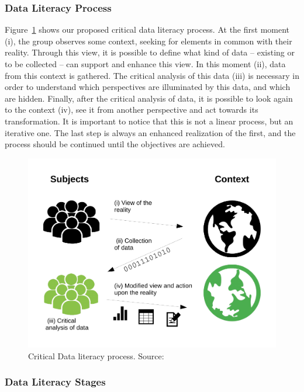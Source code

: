 \subsubsection{Data Literacy Process}

Figure~\ref{fig:critical_dl} shows our proposed critical data literacy process. At the first moment (i), the group observes some context, seeking for elements in common with their reality. Through this view, it is possible to define what kind of data – existing or to be collected – can support and enhance this view. In this moment (ii), data from this context is gathered. The critical analysis of this data (iii) is necessary in order to understand which perspectives are illuminated by this data, and which are hidden. Finally, after the critical analysis of data, it is possible to look again to the context (iv), see it from another perspective and act towards its transformation. It is important to notice that this is not a linear process, but an iterative one. The last step is always an enhanced realization of the first, and the process should be continued until the objectives are achieved.

\begin{figure}[h!]
\begin{center}
\includegraphics[scale=0.8]{images/critica_data_literacy}
\caption[Critical Data literacy process.]{Critical Data literacy process. Source:~}
\label{fig:critical_dl}
\end{center}
\end{figure}

\subsubsection{Data Literacy Stages}

